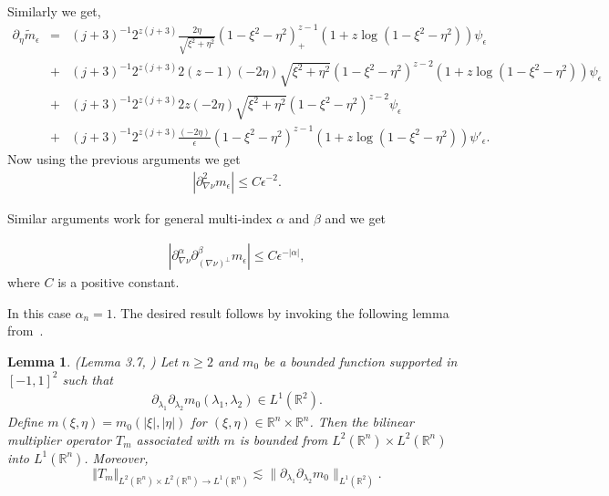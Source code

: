 \documentclass[a4paper,12pt]{amsart}
\newtheorem{lemma}[theorem]{Lemma}
\newcommand{\R}{{\mathbb {R}}}
\begin{document}
Similarly we get,
\begin{eqnarray*}
	\partial_{\eta} \tilde{m}_{\epsilon}&=&(j+3)^{-1}2^{z(j+3)}\frac{2\eta}{\sqrt{\xi^{2}+\eta^{2}}}(1-\xi^{2}-\eta^{2})_{+}^{z-1}(1+z\log(1-\xi^{2}-\eta^{2}))\psi_{\epsilon}\\ &+&(j+3)^{-1}2^{z(j+3)}2(z-1)(-2\eta)\sqrt{\xi^{2}+\eta^{2}}(1-\xi^{2}-\eta^{2})^{z-2}(1+z\log(1-\xi^{2}-\eta^{2}))\psi_{\epsilon}\\
	&+&(j+3)^{-1}2^{z(j+3)}2z(-2\eta)\sqrt{\xi^{2}+\eta^{2}} (1-\xi^{2}-\eta^{2})^{z-2}\psi_{\epsilon}\\
	&+&(j+3)^{-1}2^{z(j+3)}\frac{(-2\eta)}{\epsilon}(1-\xi^{2}-\eta^{2})^{z-1}(1+z\log(1-\xi^{2}-\eta^{2}))\psi'_{\epsilon}.
\end{eqnarray*}
Now using the previous arguments we get 
\begin{eqnarray*}
	|\partial^{2}_{\nabla\nu}m_{\epsilon}|\leq C\epsilon^{-2}.
\end{eqnarray*} 

Similar arguments work for general multi-index $\alpha$ and $\beta$ and we get 

\begin{eqnarray*} \left| \partial^{\alpha}_{\nabla \nu}\partial^{\beta}_{(\nabla \nu)^{\perp}} m_{\epsilon}\right|\leq C \epsilon^{-\vert \alpha\vert},
\end{eqnarray*}  
where $C$ is a positive constant.

 In this case $\alpha_n=1$. The desired result follows by invoking the following lemma from~\cite{Bern1}. 
\begin{lemma}(Lemma 3.7, \cite{Bern1})
Let $n\geq 2$ and $m_{0}$ be a bounded function supported in $[-1,1]^{2}$ such that 
\begin{eqnarray*}\partial_{\lambda_{1}}\partial_{\lambda_{2}}m_{0}(\lambda_{1}, \lambda_{2})\in L^{1}(\mathbb{R}^{2}).
\end{eqnarray*}
Define $m(\xi, \eta)=m_{0}(\vert \xi\vert, \vert \eta\vert)$ for $(\xi,\eta)\in \R^n \times \R^n$. Then the bilinear multiplier operator $T_{m}$ associated with $m$ is bounded from $L^{2}(\mathbb{R}^{n})\times L^{2}(\mathbb{R}^{n})$ into $L^{1}(\mathbb{R}^{n})$. Moreover, 
$$\Vert T_{m}\Vert_{L^{2}(\R^n)\times L^{2}(\R^n)\rightarrow L^{1}(\R^n)}\lesssim \|\partial_{\lambda_{1}}\partial_{\lambda_{2}}m_{0}\|_{L^1(\R^2)}.$$
 
\end{lemma}
\end{document}
